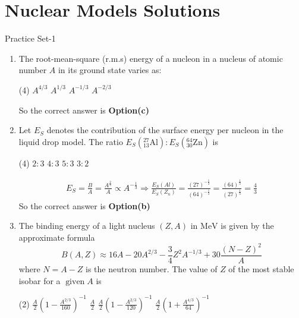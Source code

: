 \chapter{Nuclear Models Solutions}
\begin{abox}
	Practice Set-1
\end{abox}
\begin{enumerate}
	\item  The root-mean-square (r.m.s) energy of a nucleon in a nucleus of atomic number $A$ in its ground state varies as:
	\begin{tasks}(4)
		\task[\textbf{a.}]$A^{4 / 3}$
		\task[\textbf{b.}]$A^{1 / 3}$
		\task[\textbf{c.}]$A^{-1 / 3}$
		\task[\textbf{d.}]$A^{-2 / 3}$ 
	\end{tasks}
	\begin{answer}
		So the correct answer is \textbf{Option(c)}
	\end{answer}
	\item  Let $E_S$ denotes the contribution of the surface energy per nucleon in the liquid drop model. The ratio $E_S\left({ }_{13}^{27} \mathrm{Al}\right): E_S\left({ }_{30}^{64} \mathrm{Zn}\right)$ is
	{}
	\begin{tasks}(4)
		\task[\textbf{a.}]$2: 3$
		\task[\textbf{b.}]$4: 3$
		\task[\textbf{c.}]$5: 3$
		\task[\textbf{d.}]$3: 2$ 
	\end{tasks}
	\begin{answer}
		\begin{align*}
		E_S=\frac{B}{A}=\frac{A^{\frac{2}{3}}}{A} \propto A^{-\frac{1}{3}} \Rightarrow \frac{E_S(A l)}{E_S\left(Z_n\right)}=\frac{(27)^{-\frac{1}{3}}}{(64)^{-\frac{1}{3}}}=\frac{(64)^{\frac{1}{3}}}{(27)^{\frac{1}{3}}}=\frac{4}{3}
		\end{align*}
		So the correct answer is \textbf{Option(b)}
	\end{answer}
	\item  The binding energy of a light nucleus $(Z, A)$ in $\mathrm{MeV}$ is given by the approximate formula
	$$
	B(A, Z) \approx 16 A-20 A^{2 / 3}-\frac{3}{4} Z^2 A^{-1 / 3}+30 \frac{(N-Z)^2}{A}
	$$
	where $N=A-Z$ is the neutron number. The value of $Z$ of the most stable isobar for a $\operatorname{given} A$ is
	{}
	\begin{tasks}(2)
		\task[\textbf{a.}] $\frac{A}{2}\left(1-\frac{A^{2 / 3}}{160}\right)^{-1}$
		\task[\textbf{b.}]$\frac{A}{2}$
		\task[\textbf{c.}]$\frac{A}{2}\left(1-\frac{A^{2 / 3}}{120}\right)^{-1}$
		\task[\textbf{d.}] $\frac{A}{2}\left(1+\frac{A^{4 / 3}}{64}\right)^{-1}$

\end{tasks}
\end{enumerate}
